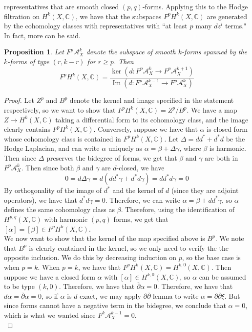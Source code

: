 \documentclass[psamsfonts, 12pt]{amsart}
\newtheorem{prop}[thm]{Proposition}
\theoremstyle{definition}
\theoremstyle{remark}
\newcommand{\C}{\mathbb{C}}
\newcommand{\dbar}{\overline{\partial}}
\DeclareMathOperator{\im}{Im}
\begin{document}
representatives that are smooth closed $(p,q)$-forms. Applying this to the
Hodge filtration on $H^k(X,\C)$, we have that the subspaces $F^pH^k(X,\C)$
are generated by the cohomology classes with representatives with
``at least $p$ many $dz^i$ terms." In fact, more can be said.
%
\begin{prop}
Let $F^p\mathcal{A}^k_X$ denote the subspace of smooth $k$-forms spanned by
the $k$-forms of type $(r,k-r)$ for $r \geq p$. Then
\[
F^pH^k(X,\C) = \frac{\ker(d : F^p \mathcal{A}^k_X \to F^p \mathcal{A}^{k+1}_X)}
{\im(d : F^p \mathcal{A}^{k-1}_X \to F^p \mathcal{A}^k_X)}
\]
\end{prop}
%
\begin{proof}
Let $Z^p$ and $B^p$ denote the kernel and image specified in the statement respectively,
so we want to show that $F^pH^k(X,\C) = Z^p/B^p$. We have a map $Z \to H^k(X,\C)$
taking a differential form to its cohomology class, and the image clearly contains
$F^pH^k(X,\C)$. Conversely, suppose we have that $\alpha$ is closed form whose
cohomology class is contained in $F^pH^k(X,\C)$. Let $\Delta = dd^* + d^*d$ be
the Hodge Laplacian, and can write $\alpha$ uniquely as $\alpha = \beta + \Delta\gamma$,
where $\beta$ is harmonic. Then since $\Delta$ preserves the bidegree of forms, we
get that $\beta$ and $\gamma$ are both in $F^p\mathcal{A}^k_X$. Then since both
$\beta$ and $\gamma$ are $d$-closed, we have
\[
0 = d\Delta\gamma = d(dd^*\gamma + d^*d\gamma) = dd^*d\gamma = 0
\]
By orthogonality of the image of $d^*$ and the kernel of $d$ (since they are
adjoint operators), we have that $d^*d\gamma = 0$. Therefore, we can write
$\alpha = \beta + dd^*\gamma$, so $\alpha$ defines the same cohomology class as
$\beta$. Therefore, using the identification of $H^{p,q}(X,\C)$ with harmonic
$(p,q)$ forms, we get that $[\alpha] = [\beta] \in F^pH^k(X,\C)$. \\

We now want to show that the kernel of the map specified above is $B^p$. We
note that $B^p$ is clearly contained in the kernel, so we only need to verify the
the opposite inclusion. We do this by decreasing induction on $p$, so the base case
is when $p = k$. When $p = k$, we have that $F^pH^k(X,\C) = H^{k,0}(X,\C)$. Then
suppose we have a closed form $\alpha$ with $[\alpha] \in H^{k,0}(X,\C)$, so
$\alpha$ can be assumed to be type $(k,0)$. Therefore, we have that $\dbar\alpha = 0$.
Therefore, we have that $d\alpha = \dbar\alpha = 0$, so if $\alpha$ is
$d$-exact, we may apply $\partial\dbar$-lemma to write $\alpha = \partial\dbar\xi$.
But since forms cannot have a negative term in the bidegree, we conclude that
$\alpha = 0$, which is what we wanted since $F^k \mathcal{A}^{k-1}_X = 0$. \\


\end{proof}
\end{document}
